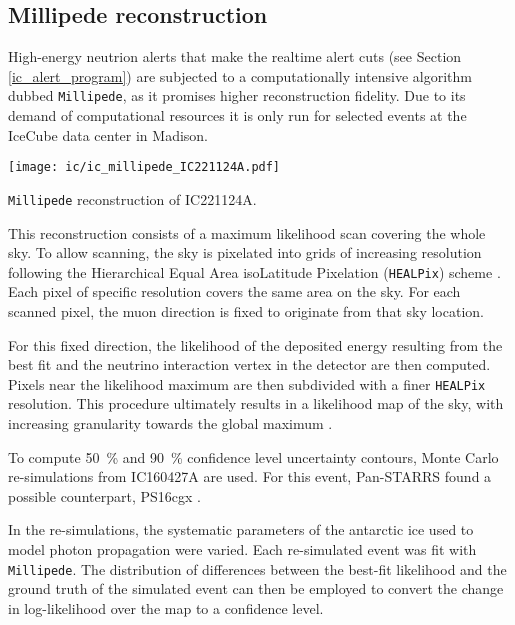 \subsection{Millipede reconstruction} \label{millipede}
High-energy neutrion alerts that make the realtime alert cuts (see Section \ref{ic_alert_program}) are subjected to a computationally intensive algorithm dubbed \texttt{Millipede}, as it promises higher reconstruction fidelity. Due to its demand of computational resources it is only run for selected events at the IceCube data center in Madison.

\begin{marginfigure}
    \texttt{[image: ic/ic\_millipede\_IC221124A.pdf]}
    \caption[\texttt{Millipede} reconstruction of IC221124A]{\texttt{Millipede} reconstruction of IC221124A.}
\end{marginfigure}

This reconstruction consists of a maximum likelihood scan covering the whole sky. To allow scanning, the sky is pixelated into grids of increasing resolution following the Hierarchical Equal Area isoLatitude Pixelation (\texttt{HEALPix}) scheme . Each pixel of specific resolution covers the same area on the sky. For each scanned pixel, the muon direction is fixed to originate from that sky location.

For this fixed direction, the likelihood of the deposited energy resulting from the best fit and the neutrino interaction vertex in the detector are then computed. Pixels near the likelihood maximum are then subdivided with a finer \texttt{HEALPix} resolution. This procedure ultimately results in a likelihood map of the sky, with increasing granularity towards the global maximum .

To compute \SI{50}{\percent} and \SI{90}{\percent} confidence level uncertainty contours, Monte Carlo re-simulations from IC160427A are used. For this event, Pan-STARRS found a possible counterpart, PS16cgx .

In the re-simulations, the systematic parameters of the antarctic ice used to model photon propagation were varied. Each re-simulated event was fit with \texttt{Millipede}. The distribution of differences between the best-fit likelihood and the ground truth of the simulated event can then be employed to convert the change in log-likelihood over the map to a confidence level.

